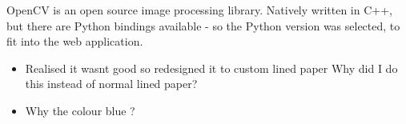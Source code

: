 OpenCV is an open source image processing library. Natively written in C++, but there are Python bindings available - so the Python version was selected, to fit into the web application.





\begin{itemize}
  \item Realised it wasnt good so redesigned it to custom lined paper Why did I do this instead of normal lined paper?
  \item Why the colour blue ?
\end{itemize}
